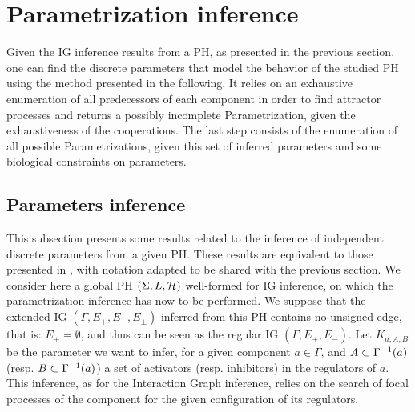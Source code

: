 \section{Parametrization inference}\label{sec:infer-K}

Given the IG inference results from a PH, as presented in the previous section, one can find the discrete parameters that model the behavior of the studied PH using the method presented in the following.
It relies on an exhaustive enumeration of all predecessors of each component in order to find attractor processes and returns a possibly incomplete Parametrization, given the exhaustiveness of the cooperations.
The last step consists of the enumeration of all possible Parametrizations, given this set of inferred parameters and some biological constraints on parameters.


\subsection{Parameters inference}

This subsection presents some results related to the inference of independent discrete parameters from a given PH. These results are equivalent to those presented in \cite{PMR10-TCSB}, with notation adapted to be shared with the previous section.
We consider here a global PH $(\Sigma,L,\mathcal{H})$ well-formed for IG inference, on which the parametrization inference has now to be performed. We suppose that the extended IG $(\Gamma, E_+, E_-, E_\pm)$ inferred from this PH contains no unsigned edge, that is: $E_\pm = \emptyset$, and thus can be seen as the regular IG $(\Gamma, E_+, E_-)$.
Let $K_{a,A,B}$ be the parameter we want to infer, for a given component $a \in \Gamma$,
and $A \subset \Gamma^{-1}(a)$ (resp. $B \subset \Gamma^{-1}(a)$) a set of activators (resp. inhibitors) in the regulators of $a$.
This inference, as for the Interaction Graph inference, relies on the search of focal processes of the component for the given configuration of its regulators.

